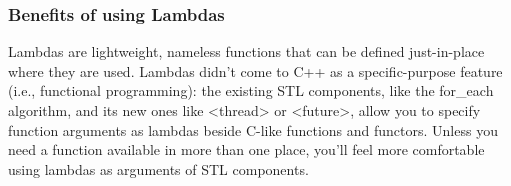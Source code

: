 \subsubsection{Benefits of using Lambdas}
Lambdas are lightweight, nameless functions that can be defined just-in-place where they are used. Lambdas didn't come to C++ as a specific-purpose feature (i.e., functional programming): the existing STL components, like the for\_each algorithm, and its new ones like <thread> or <future>, allow you to specify function arguments as lambdas beside C-like functions and functors. Unless you need a function available in more than one place, you'll feel more comfortable using lambdas as arguments of STL components.
